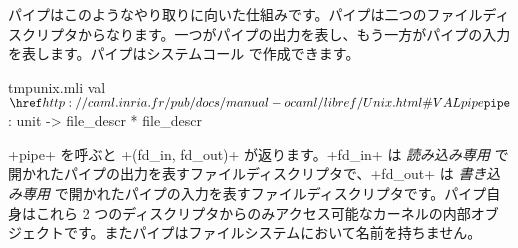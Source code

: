 パイプはこのようなやり取りに向いた仕組みです。パイプは二つのファイルディスクリプタからなります。一つがパイプの出力を表し、もう一方がパイプの入力を表します。パイプはシステムコール  で作成できます。
%
\begin{listingcodefile}{tmpunix.mli}
val $\libvalue{Unix}{pipe}$ : unit -> file_descr * file_descr
\end{listingcodefile}
%
\ml+pipe+ を呼ぶと \ml+(fd_in, fd_out)+ が返ります。\ml+fd_in+ は \emph{読み込み専用} で開かれたパイプの出力を表すファイルディスクリプタで、\ml+fd_out+ は \emph{書き込み専用} で開かれたパイプの入力を表すファイルディスクリプタです。パイプ自身はこれら 2 つのディスクリプタからのみアクセス可能なカーネルの内部オブジェクトです。またパイプはファイルシステムにおいて名前を持ちません。



\begin{myimage}[width="60\%"]
\end{myimage}


